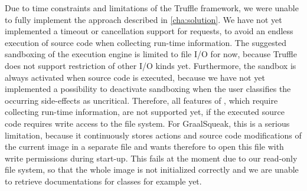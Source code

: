 Due to time constraints and limitations of the Truffle framework, we were unable to fully implement the approach described in \autoref{cha:solution}. We have not yet implemented a timeout or cancellation support for requests, to avoid an endless execution of source code when collecting run-time information. The suggested sandboxing of the execution engine is limited to file I/O for now, because Truffle does not support restriction of other I/O kinds yet. Furthermore, the sandbox is always activated when source code is executed, because we have not yet implemented a possibility to deactivate sandboxing when the user classifies the occurring side-effects as uncritical. Therefore, all features of \graallsp, which require collecting run-time information, are not supported yet, if the executed source code requires write access to the file system. For GraalSqueak, this is a serious limitation, because it continuously stores actions and source code modifications of the current image in a separate  file and wants therefore to open this file with write permissions during start-up. This fails at the moment due to our read-only file system, so that the whole image is not initialized correctly and we are unable to retrieve documentations for classes for example yet. 


